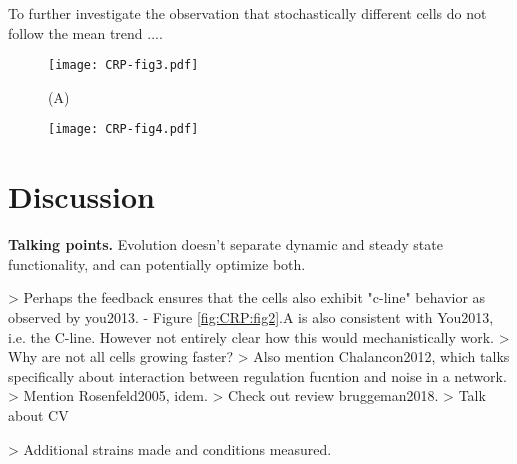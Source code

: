 To further investigate the observation that stochastically different cells do not follow the mean trend ....








\begin{figure}
	\centering
	\texttt{[image: CRP-fig3.pdf]}
	\caption{ 
		(A) 
	}
	\label{fig:CRP:fig3}
\end{figure}

\begin{figure}
	\centering
	\texttt{[image: CRP-fig4.pdf]}
	\clearpage %
	\label{fig:CRP:fig4}
\end{figure}	

\clearpage



\section*{Discussion}

\textbf{Talking points.} Evolution doesn't separate dynamic and steady state functionality, and can potentially optimize both.

> Perhaps the feedback ensures that the cells also exhibit "c-line" behavior as observed by you2013.
- Figure \ref{fig:CRP:fig2}.A is also consistent with You2013, i.e. the C-line. However not entirely clear how this would mechanistically work.
> Why are not all cells growing faster?
> Also mention Chalancon2012, which talks specifically about interaction between regulation fucntion and noise in a network.
> Mention Rosenfeld2005, idem.
> Check out review bruggeman2018.
> Talk about CV

> Additional strains made and conditions measured.

